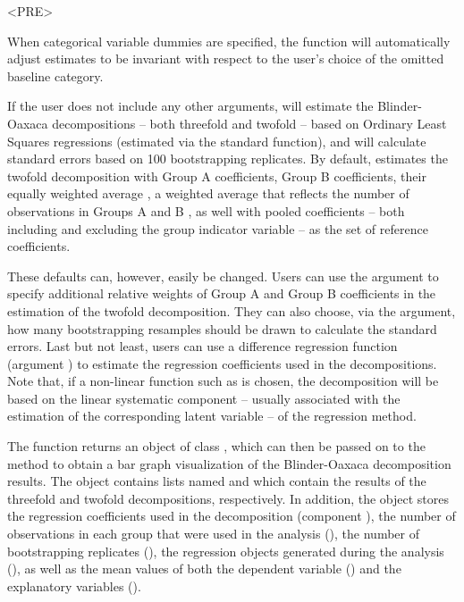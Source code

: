 <PRE>\documentclass[nojss]{jss}
\begin{document}
When categorical variable dummies are specified, the  function will automatically adjust estimates to be invariant with respect to the user's choice of the omitted baseline category.

If the user does not include any other arguments,  will estimate the Blinder-Oaxaca decompositions -- both threefold and twofold -- based on Ordinary Least Squares regressions (estimated via the standard  function), and will calculate standard errors based on 100 bootstrapping replicates. By default,  estimates the twofold decomposition with Group A coefficients, Group B coefficients, their equally weighted average \citep{Reimers1983}, a weighted average that reflects the number of observations in Groups A and B \citep{Cotton1988}, as well with pooled coefficients -- both including and excluding the group indicator variable \citep{Neumark1988, Jann2008} -- as the set of reference coefficients.

These defaults can, however, easily be changed. Users can use the argument  to specify additional relative weights of Group A and Group B coefficients in the estimation of the twofold decomposition. They can also choose, via the  argument, how many bootstrapping resamples should be drawn to calculate the standard errors. Last but not least, users can use a difference regression function (argument ) to estimate the regression coefficients used in the decompositions. Note that, if a non-linear function such as  is chosen, the decomposition will be based on the linear systematic component -- usually associated with the estimation of the corresponding latent variable -- of the regression method.

The function  returns an object of class , which can then be passed on to the  method to obtain a bar graph visualization of the Blinder-Oaxaca decomposition results. The object contains lists named  and  which contain the results of the threefold and twofold decompositions, respectively. In addition, the object stores the regression coefficients used in the decomposition (component ), the number of observations in each group that were used in the analysis (), the number of bootstrapping replicates (), the regression objects generated during the analysis (), as well as the mean values of both the dependent variable () and the explanatory variables ().
\end{document}
